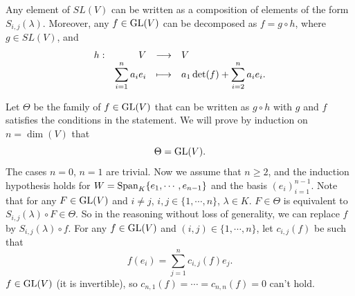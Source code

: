 \begin{lemmaenv}\label{lem:5.6.7}
    Any element of $SL(V)$ can be written as a composition of elements of the form $S_{i,j}(\lambda)$.
    Moreover, any $f \in \operatorname{\mathrm{GL}}(V)$ can be decomposed as $f = g \circ h$,
    where $g \in SL(V)$, and
    $$\begin{array}{rrcl}
        h : & V & \longrightarrow & V\\
        & \displaystyle \sum_{i=1}^n a_i e_i & \longmapsto & \displaystyle a_1 \det (f) + \sum_{i=2}^n a_i e_i.
    \end{array}$$
\end{lemmaenv}
\begin{proofenv}
    Let $\Theta$ be the family of $f \in \operatorname{\mathrm{GL}}(V)$ that can be written as $g \circ h$ with $g$ and $f$ satisfies the conditions in the statement.
    We will prove by induction on $n = \dim (V)$ that
    $$\Theta = \operatorname{\mathrm{GL}}(V).$$
    The cases $n = 0$, $n = 1$ are trivial.
    Now we assume that $n \ge 2$, and the induction hypothesis holds for $W = \operatorname{\mathrm{Span}}_{K}\{e_1,\cdots,e_{n-1}\}$
    and the basis $(e_i)_{i=1}^{n-1}$.
    Note that for any $F \in \operatorname{\mathrm{GL}}(V)$ and $i\neq j$, $i,j \in \{1,\cdots,n\}$, $\lambda \in K$.
    $F \in \Theta$ is equivalent to $S_{i,j}(\lambda) \circ F \in \Theta$.
    So in the reasoning without loss of generality,
    we can replace $f$ by $S_{i,j}(\lambda) \circ f$.
    For any $f \in \operatorname{\mathrm{GL}}(V)$ and $(i,j) \in \{1,\cdots,n\}$, let $c_{i,j}(f)$ be such that
    $$f(e_i) = \sum_{j=1}^{n} c_{i,j}(f) e_j.$$
    $f \in \operatorname{\mathrm{GL}}(V)$ (it is invertible), so $c_{n,1}(f) = \cdots = c_{n,n}(f) = 0$ can't hold.
    

\end{proofenv}
